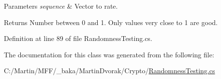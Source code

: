 \begin{DoxyParams}{Parameters}
{\em sequence} & Vector to rate.\\
\hline
\end{DoxyParams}
\begin{DoxyReturn}{Returns}
Number between 0 and 1. Only values very close to 1 are good.
\end{DoxyReturn}


Definition at line 89 of file Randomness\+Testing.\+cs.



The documentation for this class was generated from the following file\+:\begin{DoxyCompactItemize}
\item 
C\+:/\+Martin/\+M\+F\+F/\+\_\+baka/\+Martin\+Dvorak/\+Crypto/\hyperlink{_randomness_testing_8cs}{Randomness\+Testing.\+cs}\end{DoxyCompactItemize}
